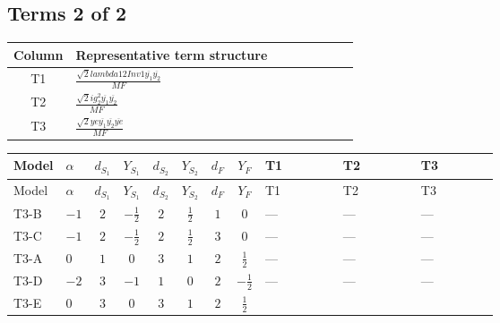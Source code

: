 \documentclass[8pt]{article}
\begin{document}
\begin{landscape}
\subsection*{Terms 2 of 2}
\begin{center}
\begin{tabular}{@{}c >{\raggedright\arraybackslash}p{0.82\linewidth}@{}}
\toprule
Column & Representative term structure \\
\midrule
T1 & \(\displaystyle \frac{\sqrt{2} lambda12Inv1 \overline{y_{1}} \overline{y_{2}}}{MF}\) \\
\midrule
T2 & \(\displaystyle \frac{\sqrt{2} i g_{2}^{2} \overline{y_{1}} \overline{y_{2}}}{MF}\) \\
\midrule
T3 & \(\displaystyle \frac{\sqrt{2} ye \overline{y_{1}} \overline{y_{2}} \overline{ye}}{MF}\) \\
\midrule
\bottomrule
\end{tabular}
\end{center}
\smallskip
\tiny
\begin{longtable}{@{}llcccccc >{\raggedright\arraybackslash}p{0.21\linewidth} >{\raggedright\arraybackslash}p{0.21\linewidth} >{\raggedright\arraybackslash}p{0.21\linewidth}@{}}
\toprule
Model & $\alpha$ & $d_{S_1}$ & $Y_{S_1}$ & $d_{S_2}$ & $Y_{S_2}$ & $d_F$ & $Y_F$ & T1 & T2 & T3 \\
\midrule
\endfirsthead
\toprule
Model & $\alpha$ & $d_{S_1}$ & $Y_{S_1}$ & $d_{S_2}$ & $Y_{S_2}$ & $d_F$ & $Y_F$ & T1 & T2 & T3 \\
\midrule
\endhead
T3-B & $-1$ & $2$ & $-\frac{1}{2}$ & $2$ & $\frac{1}{2}$ & $1$ & $0$ & --- & --- & --- \\
\midrule
T3-C & $-1$ & $2$ & $-\frac{1}{2}$ & $2$ & $\frac{1}{2}$ & $3$ & $0$ & --- & --- & --- \\
\midrule
T3-A & $0$ & $1$ & $0$ & $3$ & $1$ & $2$ & $\frac{1}{2}$ & --- & --- & --- \\
\midrule
T3-D & $-2$ & $3$ & $-1$ & $1$ & $0$ & $2$ & $-\frac{1}{2}$ & --- & --- & --- \\
\midrule
T3-E & $0$ & $3$ & $0$ & $3$ & $1$ & $2$ & $\frac{1}{2}$ & \scriptsize\adjustbox{max width=\linewidth}{$\begin{gathered} \frac{\sqrt{2} lambda12Inv1 \overline{y_{1}} \overline{y_{2}}}{4 MF}\end{gathered}$} & \scriptsize\adjustbox{max width=\linewidth}{$\begin{gathered} \frac{\sqrt{2} i g_{2}^{2} \overline{y_{1}} \overline{y_{2}}}{4 MF}\end{gathered}$} & \scriptsize\adjustbox{max width=\linewidth}{$\begin{gathered} \frac{\sqrt{2} ye \overline{y_{1}} \overline{y_{2}} \overline{ye}}{8 MF}\end{gathered}$} \\
\midrule
\bottomrule
\end{longtable}
\clearpage

\end{landscape}
\end{document}
